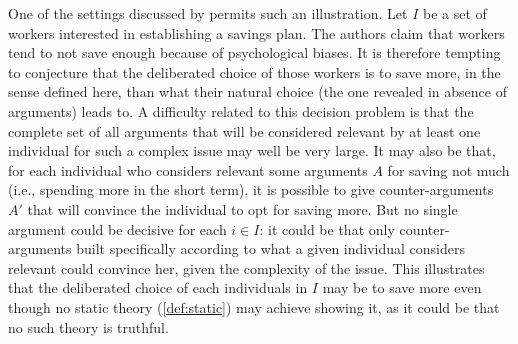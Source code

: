 \documentclass[version=last, pagesize, twoside=off, bibliography=totoc, DIV=calc, fontsize=12pt, a4paper, french, english]{scrartcl}
\begin{document}
One of the settings discussed by \citet{thaler_nudge_2009} permits such an illustration. %
Let $I$ be a set of workers interested in establishing a savings plan. 
The authors claim that workers tend to not save enough because of psychological biases. 
It is therefore tempting to conjecture that the deliberated choice of those workers is to save more, in the sense defined here, than what their natural choice (the one revealed in absence of arguments) leads to.
A difficulty related to this decision problem is that the complete set of all arguments that will be considered relevant by at least one individual for such a complex issue may well be very large. It may also be that, for each individual who considers relevant some arguments $A$ for saving not much (i.e., spending more in the short term), it is possible to give counter-arguments $A'$ that will convince the individual to opt for saving more.
But no single argument could be decisive for each $i \in I$: it could be that only counter-arguments built specifically according to what a given individual considers relevant could convince her, given the complexity of the issue.
This illustrates that the deliberated choice of each individuals in $I$ may be to save more even though no static theory (\cref{def:static}) may achieve showing it, as it could be that no such theory is truthful.

\end{document}
